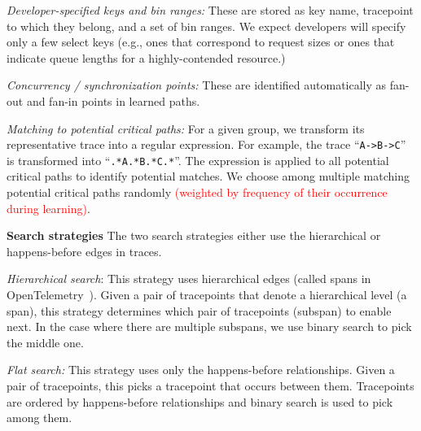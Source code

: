 \textit{Developer-specified keys and bin ranges:} These are stored as
key name, tracepoint to which they belong, and a set
of bin ranges.  We expect developers will specify only a few select
keys (e.g., ones that correspond to request sizes or ones that
indicate queue lengths for a highly-contended resource.)

\textit{Concurrency / synchronization points:}
These are identified automatically as fan-out and fan-in points in
learned paths.

\textit{Matching to potential critical paths:} For a given group, we transform
its representative trace into a regular expression.  
For example, the trace ``\texttt{A->B->C}'' is
transformed into ``\texttt{.*A.*B.*C.*}''.  The
expression is applied to all potential critical paths to identify
potential matches.  
We choose among multiple matching potential critical paths randomly
\textcolor{red}{(weighted by frequency of their occurrence during learning)}.



\noindent\textbf{Search strategies} The two search strategies either
use the hierarchical or happens-before edges in traces.


\textit{Hierarchical search}: This strategy
uses hierarchical edges (called spans in
OpenTelemetry~\cite{opentelemetry}).  Given a pair of tracepoints
that denote a hierarchical level (a span), this strategy determines
which pair of tracepoints (subspan) to enable next.  In the case where
there are multiple subspans, we use binary search to pick the middle
one.

\textit{Flat search:} This strategy uses only
the happens-before relationships.  Given a pair of tracepoints, this
picks a tracepoint that occurs between them.
Tracepoints are ordered by happens-before
relationships and binary search is used to pick among them.


